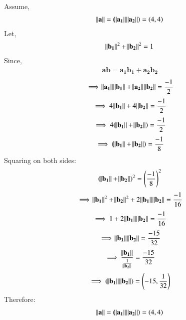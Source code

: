 \documentclass[12pt,-letter paper]{article}
\let\vec\mathbf{}
\let\vec\mathbf{}
\let\vec\mathbf{}
\providecommand{\brak}[1]{\ensuremath{\left(#1\right)}}
\providecommand{\brak}[1]{\ensuremath{\left(#1\right)}}
\begin{document}
\begin{enumerate}
Assume, 
\begin{align}
    \norm{\vec{a}}=(\norm{\vec{a_1}}\vec{\norm{a_2}}) = (4,4)
    \end{align}
Let, 
\begin{align}
\norm{\vec{b_1}}^2+\norm{\vec{b_2}}^2 =1 
\end{align}
Since, 
\begin{align}
\vec{a}\vec{b}= \vec{a_1}\vec{b_1} + \vec{a_2}\vec{b_2} 
\end{align}
    \begin{align}
\implies \norm{\vec{a_1}}\norm{\vec{b_1}}+\norm{\vec{a_2}}\norm{\vec{b_2}}= \frac{-1}{2}
    \end{align}
    \begin{align}
 \implies 4\norm{\vec{b_1}}+ 4\norm{\vec{b_2}} =\frac{-1}{2}
    \end{align}
    \begin{align}
 \implies   4(\norm{\vec{b_1}}+\norm{\vec{b_2}}) = \frac{-1}{2}
    \end{align}
    \begin{align}
   \implies (\norm{\vec{b_1}}+\norm{\vec{b_2}}) = \frac{-1}{8}
    \end{align}
    Squaring on both sides:
  \begin{align}
  (\norm{\vec{b_1}}+\norm{\vec{b_2}})^2 =\brak{\frac{-1}{8}}^2
  \end{align}
  \begin{align}
 \implies \norm{\vec{b_1}}^2+\norm{\vec{b_2}}^2+2\norm{\vec{b_1}}\norm{\vec{b_2}} =\frac{-1}{16}
  \end{align}
  \begin{align}
 \implies  1+2\norm{\vec{b_1}}\norm{\vec{b_2}} =\frac{-1}{16}
\end{align}
\begin{align}
\implies \norm{\vec{b_1}}\norm{\vec{b_2}} = \frac{-15}{32}
  \end{align}  
  \begin{align}
\implies \frac{\norm{\vec{b_1}}}{\frac{1}{\norm{\vec{b_2}}}} = \frac{-15}{32}
  \end{align}
  \begin{align}
 \implies  (\norm{\vec{b_1}}\vec{\norm{b_2}}) = \brak{-15,\frac{1}{32}}
  \end{align}
  Therefore:
  \begin{align}
    \norm{\vec{a}}=(\norm{\vec{a_1}}\vec{\norm{a_2}}) = (4,4)
    \end{align}
     \begin{align}

\end{align}
\end{enumerate}
\end{document}
